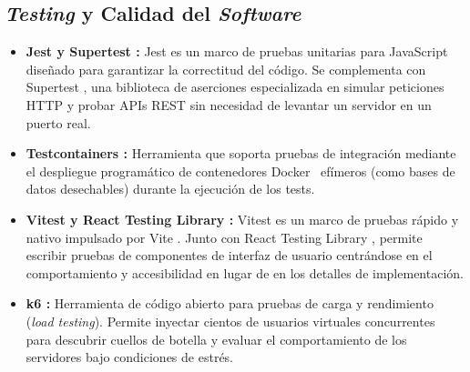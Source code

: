\subsection{\textit{Testing} y Calidad del \textit{Software}}
\begin{itemize}
    \item \textbf{Jest \cite{jest} y Supertest \cite{supertest}:} Jest \cite{jest} es un marco de pruebas unitarias para JavaScript diseñado para garantizar la correctitud del código. Se complementa con Supertest \cite{supertest}, una biblioteca de aserciones especializada en simular peticiones HTTP y probar APIs REST sin necesidad de levantar un servidor en un puerto real.
    \item \textbf{Testcontainers \cite{testcontainers}:} Herramienta que soporta pruebas de integración mediante el despliegue programático de contenedores Docker~\cite{docker} \cite{docker} efímeros (como bases de datos desechables) durante la ejecución de los tests.
    \item \textbf{Vitest \cite{vitest} y React Testing Library \cite{reacttestinglibrary}:} Vitest \cite{vitest} es un marco de pruebas rápido y nativo impulsado por Vite \cite{vite}. Junto con React Testing Library \cite{reacttestinglibrary}, permite escribir pruebas de componentes de interfaz de usuario centrándose en el comportamiento y accesibilidad en lugar de en los detalles de implementación.
    \item \textbf{k6 \cite{k6}:} Herramienta de código abierto para pruebas de carga y rendimiento (\textit{load testing}). Permite inyectar cientos de usuarios virtuales concurrentes para descubrir cuellos de botella y evaluar el comportamiento de los servidores bajo condiciones de estrés.
\end{itemize}

